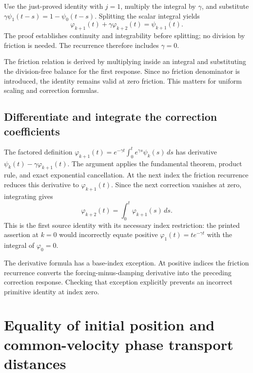\documentclass[11pt,a4paper]{report}
\begin{document}
Use the just-proved identity with \(j=1\), multiply the integral by \(\gamma\), and substitute \(\gamma\psi_1(t-s)=1-\psi_0(t-s)\). Splitting the scalar integral yields \[\varphi_{k+1}(t)+\gamma\varphi_{k+2}(t)=\psi_{k+1}(t).\] The proof establishes continuity and integrability before splitting; no division by friction is needed. The recurrence therefore includes \(\gamma=0\).



The friction relation is derived by multiplying inside an integral and substituting the division-free balance for the first response. Since no friction denominator is introduced, the identity remains valid at zero friction. This matters for uniform scaling and correction formulas.

\subsection{\texorpdfstring{Differentiate and integrate the correction coefficients}{Differentiate and integrate the correction coefficients}}
\label{report-step-KineticLangevin-ScalarConvolution-lean-3}


The factored definition \(\varphi_{k+1}(t)=e^{-\gamma t}\int_0^te^{\gamma s}\psi_k(s)\,ds\) has derivative \(\psi_k(t)-\gamma\varphi_{k+1}(t)\). The argument applies the fundamental theorem, product rule, and exact exponential cancellation. At the next index the friction recurrence reduces this derivative to \(\varphi_{k+1}(t)\). Since the next correction vanishes at zero, integrating gives \[\varphi_{k+2}(t)=\int_0^t\varphi_{k+1}(s)\,ds.\] This is the first source identity with its necessary index restriction: the printed assertion at \(k=0\) would incorrectly equate positive \(\varphi_1(t)=te^{-\gamma t}\) with the integral of \(\varphi_0=0\).



The derivative formula has a base-index exception. At positive indices the friction recurrence converts the forcing-minus-damping derivative into the preceding correction response. Checking that exception explicitly prevents an incorrect primitive identity at index zero.

\section{\texorpdfstring{Equality of initial position and common-velocity phase transport distances}{Equality of initial position and common-velocity phase transport distances}}
\label{proof-module-KineticLangevin-PhaseInitialTransport-lean}
\end{document}
